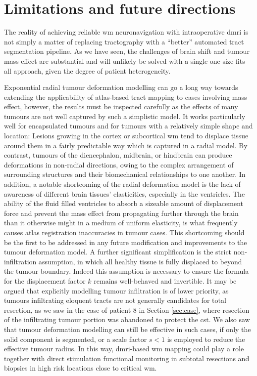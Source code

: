 \documentclass[12pt,phd,a4paper,twoside]{ucl_thesis}
\providecommand{\DIFaddend}{} %
\DeclareRobustCommand{\DIFaddend}{\DIFOaddend \let\includegraphics\DIFOincludegraphics} %
\begin{document}
\DIFaddend \section{Limitations and future directions}\label{sec:future}

The reality of achieving reliable \gls{wm} neuronavigation with intraoperative \gls{dmri} is not simply a matter of replacing tractography with a ``better'' automated tract segmentation pipeline.
As we have seen, the challenges of brain shift and tumour mass effect are substantial and will unlikely be solved with a single one-size-fits-all approach, given the degree of patient heterogeneity.

Exponential radial tumour deformation modelling can go a long way towards extending the applicability of atlas-based tract mapping to cases involving mass effect, however, the results must be inspected carefully as the effects of many tumours are not well captured by such a simplistic model.
It works particularly well for encapsulated tumours and for tumours with a relatively simple shape and location:
Lesions growing in the cortex or subcortical \gls{wm} tend to displace tissue around them in a fairly predictable way which is captured in a radial model.
By contrast, tumours of the diencephalon, midbrain, or hindbrain can produce deformations in non-radial directions, owing to the complex arrangement of surrounding structures and their biomechanical relationships to one another.
In addition, a notable shortcoming of the radial deformation model is the lack of awareness of different brain tissues' elasticities, especially in the ventricles.
The ability of the fluid filled ventricles to absorb a sizeable amount of displacement force and prevent the mass effect from propagating further through the brain than it otherwise might in a medium of uniform elasticity, is what frequently causes atlas registration inaccuracies in tumour cases.
This shortcoming should be the first to be addressed in any future modification and improvements to the tumour deformation model.
A further significant simplification is the strict non-infiltration assumption, in which all healthy tissue is fully displaced to beyond the tumour boundary.
Indeed this assumption is necessary to ensure the formula for the displacement factor $k$ remains well-behaved and invertible.
It may be argued that explicitly modelling tumour infiltration is of lower priority, as tumours infiltrating eloquent tracts are not generally candidates for total resection, as we saw in the case of patient 8 in Section \ref{sec:case}, where resection of the infiltrating tumour portion was abandoned to protect the \gls{cst}.
We also saw that tumour deformation modelling can still be effective in such cases, if only the solid component is segmented, or a scale factor $s<1$ is employed to reduce the effective tumour radius.
In this way, \gls{dmri}-based \gls{wm} mapping could play a role together with direct stimulation functional monitoring in subtotal resections and biopsies in high risk locations close to critical \gls{wm}.
\end{document}
